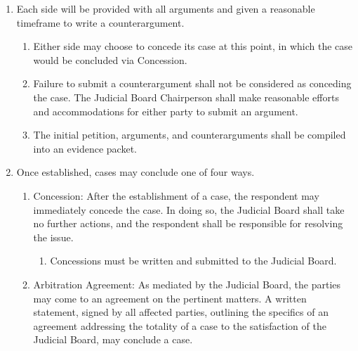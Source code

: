 \begin{enumerate}
\begin{enumerate}
      \item Both the complainant and the respondent shall be provided with a copy of the initial petition and a reasonable timeframe to prepare an initial argument for their side.
        \begin{enumerate}
          \item In providing copies of the initial petition to both sides, the Judicial Board Chairperson may redact personal information as is reasonable to protect anonymity.
          \item Failure to submit an argument shall not be considered as conceding the case. The Judicial Board Chairperson must make reasonable efforts and accommodations for either party to submit an argument.
        \end{enumerate}
    \end{enumerate}
  \item Each side will be provided with all arguments and given a reasonable timeframe to write a counterargument.
    \begin{enumerate}
      \item Either side may choose to concede its case at this point, in which the case would be concluded via Concession.
      \item Failure to submit a counterargument shall not be considered as conceding the case. The Judicial Board Chairperson shall make reasonable efforts and accommodations for either party to submit an argument.
      \item The initial petition, arguments, and counterarguments shall be compiled into an evidence packet.
    \end{enumerate}
  \item Once established, cases may conclude one of four ways.
    \begin{enumerate}
      \item Concession: After the establishment of a case, the respondent may immediately concede the case. In doing so, the Judicial Board shall take no further actions, and the respondent shall be responsible for resolving the issue.
        \begin{enumerate}
          \item Concessions must be written and submitted to the Judicial Board.
        \end{enumerate}
      \item Arbitration Agreement: As mediated by the Judicial Board, the parties may come to an agreement on the pertinent matters. A written statement, signed by all affected parties, outlining the specifics of an agreement addressing the totality of a case to the satisfaction of the Judicial Board, may conclude a case.

\end{enumerate}
\end{enumerate}
